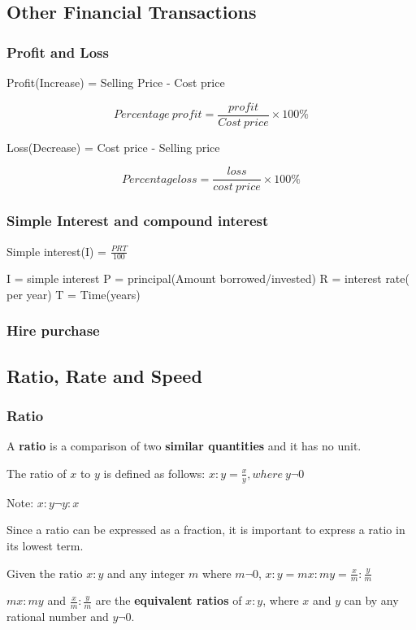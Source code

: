 \documentclass[../main]{subfiles}
\begin{document}
\subsection{Other Financial Transactions}
\subsubsection{Profit and Loss}

Profit(Increase) = Selling Price - Cost price

\[Percentage\ profit={\frac {profit} {Cost\ price}} \times 100\%\]

Loss(Decrease) = Cost price - Selling price

\[  Percentage loss = {\frac {loss} {cost\ price}} \times 100\%\]

\subsubsection{Simple Interest and compound interest}

Simple interest(I) = \({\frac {PRT} {100}}\)

I = simple interest
P = principal(Amount borrowed/invested)
R = interest rate( per year)
T = Time(years)

\subsubsection{Hire purchase}

\subsection{Ratio, Rate and Speed}
\subsubsection{Ratio}
A \textbf{ratio} is a comparison of two \textbf{similar quantities} and it has
no unit.

The ratio of $x$ to $y$ is defined as follows:
\(x:y={\frac x y}, where\ y \neg 0\)

Note: \(x:y \neg y:x\)

Since a ratio can be expressed as a fraction, it is important to express a ratio
in its lowest term.

Given the ratio \(x:y\) and any integer $m$ where \(m \neg 0\), \(x:y = mx:my =
{\frac x m}:{\frac y m}\)

\(mx:my\) and \({\frac x m}:{\frac y m}\) are the \textbf{equivalent ratios} of
\(x:y\), where $x$ and $y$ can by any rational number and \(y \neg 0\).
\end{document}
